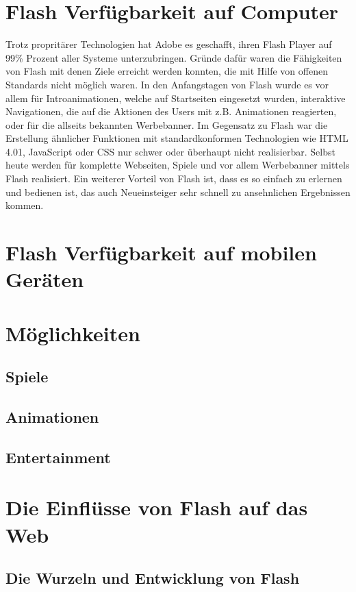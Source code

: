 \section{Flash Verfügbarkeit auf Computer}
Trotz propritärer Technologien hat Adobe es geschafft, ihren Flash Player auf 99\%
Prozent aller Systeme unterzubringen. Gründe dafür waren die Fähigkeiten von Flash
mit denen Ziele erreicht werden konnten, die mit Hilfe von offenen Standards nicht
möglich waren. In den Anfangstagen von Flash wurde es vor allem für Introanimationen,
welche auf Startseiten eingesetzt wurden, interaktive Navigationen, die auf die Aktionen
des Users mit z.B. Animationen reagierten, oder für die allseits bekannten Werbebanner.
Im Gegensatz zu Flash war die Erstellung ähnlicher Funktionen mit standardkonformen 
Technologien wie HTML 4.01, JavaScript oder CSS nur schwer oder überhaupt nicht 
realisierbar. Selbst heute werden für komplette Webseiten, Spiele und vor allem
Werbebanner mittels Flash realisiert. Ein weiterer Vorteil von Flash ist, dass es so einfach
zu erlernen und bedienen ist, das auch Neueinsteiger sehr schnell zu ansehnlichen 
Ergebnissen kommen.

\section{Flash Verfügbarkeit auf mobilen Geräten}

\section{Möglichkeiten}
\subsection{Spiele}
\subsection{Animationen}
\subsection{Entertainment}

\section{Die Einflüsse von Flash auf das Web}
\subsection{Die Wurzeln und Entwicklung von Flash}

